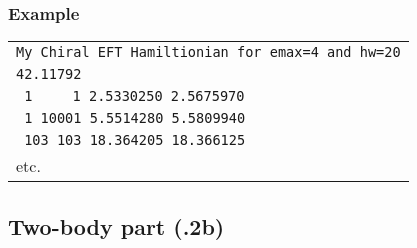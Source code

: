 \documentclass[a4paper,11pt]{article}
\renewcommand{\tt}[1]{\texttt{#1}}
\begin{document}
\subsubsection*{Example}
\begin{center}
\begin{tabular}{|l|}
\hline
\tt{My Chiral EFT Hamiltionian for emax=4 and hw=20} \\
\tt{42.11792} \\
\tt{   \phantom{10}1      $\phantom{1000}$1   2.5330250        2.5675970} \\
\tt{   \phantom{10}1                  10001   5.5514280        5.5809940} \\
\tt{             103        \phantom{10}103   18.364205        18.366125} \\
        \phantom{00000000000} etc.  \\
\hline
\end{tabular}
\end{center}

\subsection{Two-body part (.2b)}
\end{document}
